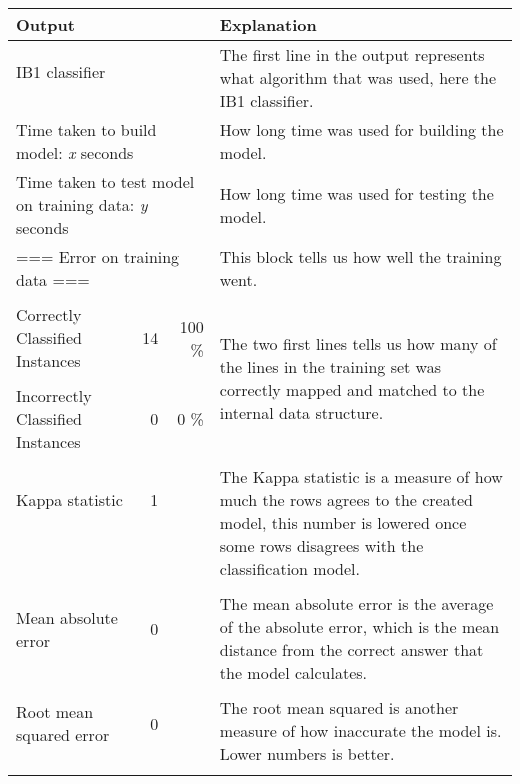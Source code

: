 \documentclass[english,a4paper]{article}
\begin{document}
\begin{longtable}{|lrr|l|}
\hline
\textbf{Output} &&& \textbf{Explanation}\\
\hline
IB1 classifier	&&& \multirow{2}{210pt}{The first line in the output represents
what algorithm that was used, here the IB1 classifier.}
\\
&&&\\
\hline
\multicolumn{3}{|l|}{Time taken to build model: \emph{x} seconds}& How long time
was used for building the model.\\
\hline
\multicolumn{3}{|l|}{Time taken to test model on training data:  \emph{y}
seconds}& How long time was used for testing the model.\\
\hline
\multicolumn{3}{|l|}{=== Error on training data ===}&
This block tells us how well the training went.\\
&&&\\
Correctly Classified Instances&          14 &             100     
\%&\multirow{3}{210pt}{ The two first lines tells us how many of the lines in
the training set was correctly mapped and matched to the internal data
structure.
}\\
&&&\\
Incorrectly Classified Instances&         0 &               0      \%&\\
&&&\\
Kappa statistic                  &        1 &    &\multirow{4}{210pt}{
The Kappa statistic is a measure of how much the rows agrees to the
created model, this number is lowered once some rows disagrees with the
classification model.}
\\
&&&\\
&&&\\
&&&\\
&&&\\
Mean absolute error              &        0  &   &\multirow{3}{210pt}{
The mean absolute error is the average of the absolute error, which is the mean
distance from the correct answer that the model calculates.}\\
&&&\\
&&&\\
&&&\\
Root mean squared error          &        0  &   &\multirow{3}{210pt}{
The root mean squared is another measure of how inaccurate the model is. Lower
numbers is better.}\\
&&&\\
&&&\\
&&&\\

\end{longtable}
\end{document}
